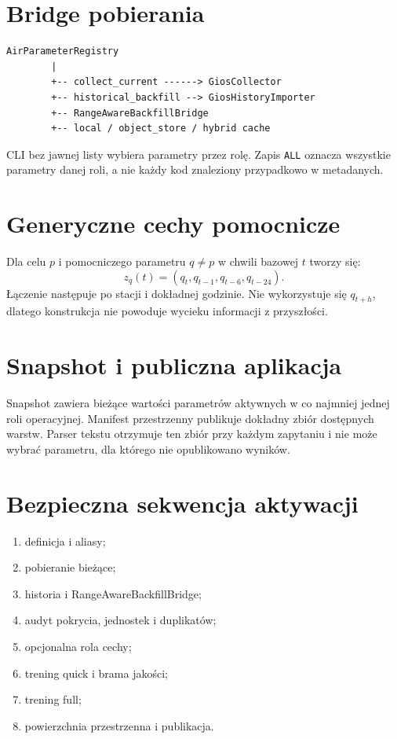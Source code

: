 \documentclass[11pt,a4paper]{article}
\begin{document}
\section{Bridge pobierania}

\begin{lstlisting}
AirParameterRegistry
        |
        +-- collect_current ------> GiosCollector
        +-- historical_backfill --> GiosHistoryImporter
        +-- RangeAwareBackfillBridge
        +-- local / object_store / hybrid cache
\end{lstlisting}

CLI bez jawnej listy wybiera parametry przez rolę. Zapis \texttt{ALL} oznacza
wszystkie parametry danej roli, a nie każdy kod znaleziony przypadkowo w
metadanych.

\section{Generyczne cechy pomocnicze}

Dla celu $p$ i pomocniczego parametru $q\ne p$ w chwili bazowej $t$ tworzy
się:
\[
 z_q(t)=\left(q_t,q_{t-1},q_{t-6},q_{t-24}\right).
\]
Łączenie następuje po stacji i dokładnej godzinie. Nie wykorzystuje się
$q_{t+h}$, dlatego konstrukcja nie powoduje wycieku informacji z przyszłości.

\section{Snapshot i publiczna aplikacja}

Snapshot zawiera bieżące wartości parametrów aktywnych w co najmniej jednej
roli operacyjnej. Manifest przestrzenny publikuje dokładny zbiór dostępnych
warstw. Parser tekstu otrzymuje ten zbiór przy każdym zapytaniu i nie może
wybrać parametru, dla którego nie opublikowano wyników.

\section{Bezpieczna sekwencja aktywacji}

\begin{enumerate}[nosep]
  \item definicja i aliasy;
  \item pobieranie bieżące;
  \item historia i RangeAwareBackfillBridge;
  \item audyt pokrycia, jednostek i duplikatów;
  \item opcjonalna rola cechy;
  \item trening quick i brama jakości;
  \item trening full;
  \item powierzchnia przestrzenna i publikacja.
\end{enumerate}
\end{document}
